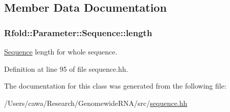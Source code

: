 \subsection{Member Data Documentation}
\hypertarget{class_rfold_1_1_parameter_1_1_sequence_aa9e3bfb9862ce32ecc4ab2260e4dd40c}{
\subsubsection[{length}]{ Rfold\+::\+Parameter\+::\+Sequence\+::length}}\label{class_rfold_1_1_parameter_1_1_sequence_aa9e3bfb9862ce32ecc4ab2260e4dd40c}
\hyperlink{class_rfold_1_1_parameter_1_1_sequence}{Sequence} length for whole sequence. 

Definition at line 95 of file sequence.\+hh.



The documentation for this class was generated from the following file\+:\begin{DoxyCompactItemize}
\item 
/\+Users/cawa/\+Research/\+Genomewide\+R\+N\+A/src/\hyperlink{sequence_8hh}{sequence.\+hh}\end{DoxyCompactItemize}
